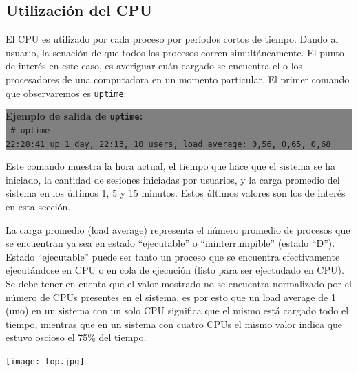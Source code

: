 \documentclass[12pt]{article}
\begin{document}
\subsection*{Utilización del CPU}

El CPU es utilizado por cada proceso por períodos cortos de tiempo. Dando 
al usuario, la senación de que todos los procesos corren simultáneamente.
El punto de interés en este caso, es averiguar cuán cargado se encuentra
el o los procesadores de una computadora en un momento particular. El 
primer comando que observaremos es \texttt{uptime}:


\colorbox{grey}{\parbox[t]{0.95\linewidth}{ \vspace*{0.5cm} { 
{\bf Ejemplo de salida de \texttt{uptime}:} \\
{\tt
# uptime \\
 22:28:41 up 1 day, 22:13, 10 users,  load average: 0,56, 0,65, 0,68
}
} \vspace*{0.5cm} } } 

Este comando muestra la hora actual, el tiempo que hace que el sistema se 
ha iniciado, la cantidad de sesiones iniciadas por usuarios, y la carga 
promedio del sistema en los últimos 1, 5 y 15 minutos. Estos últimos valores
son los de interés en esta sección. 

La carga promedio (load average) representa el número promedio de procesos
que se encuentran ya sea en estado ``ejecutable'' o ``ininterrumpible'' 
(estado ``D'').  Estado ``ejecutable'' puede ser tanto un proceso que se 
encuentra efectivamente ejecutándose en CPU o en cola de ejecución 
(listo para ser ejectudado en CPU).  Se debe tener en cuenta que el valor 
mostrado no se encuentra normalizado por el número de CPUs presentes en 
el sistema, es por esto que un load average de 1 (uno) en un sistema con 
un solo CPU significa que el mismo está cargado todo el tiempo, mientras 
que en un sistema con cuatro CPUs el mismo valor indica que estuvo oscioso
el 75\% del tiempo. 


\begin{center}
 \texttt{[image: top.jpg]}
\end{center}



\end{document}
